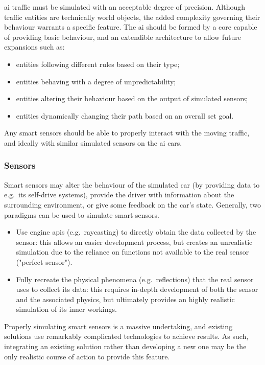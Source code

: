 \gls{ai} traffic must be simulated with an acceptable degree of precision. Although traffic entities are technically world objects, the added complexity governing their behaviour warrants a specific \gls{feature}. The \gls{ai} should be formed by a core capable of providing basic behaviour, and an extendible architecture to allow future expansions such as:

\begin{itemize}
	\item entities following different rules based on their type;
    \item entities behaving with a degree of unpredictability;
    \item entities altering their behaviour based on the output of simulated sensors;
    \item entities dynamically changing their path based on an overall set goal.
\end{itemize}

Any smart sensors should be able to properly interact with the moving traffic, and ideally with similar simulated sensors on the \gls{ai} cars.

\subsubsection{Sensors}

Smart sensors may alter the behaviour of the simulated car (by providing data to e.g.\ its self-drive systems), provide the driver with information about the surrounding environment, or give some feedback on the car's state. Generally, two paradigms can be used to simulate smart sensors.

\begin{itemize}
	\item Use engine \glspl{api} (e.g.\ raycasting) to directly obtain the data collected by the sensor: this allows an easier development process, but creates an unrealistic simulation due to the reliance on functions not available to the real sensor ("perfect sensor").
    \item Fully recreate the physical phenomena (e.g.\ reflections) that the real sensor uses to collect its data: this requires in-depth development of both the sensor and the associated physics, but ultimately provides an highly realistic simulation of its inner workings.
\end{itemize}

Properly simulating smart sensors is a massive undertaking, and existing solutions use remarkably complicated technologies to achieve results. As such, integrating an existing solution rather than developing a new one may be the only realistic course of action to provide this \gls{feature}.

